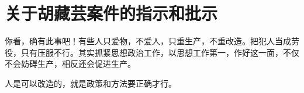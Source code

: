 \section[关于胡藏芸案件的指示和批示（一九六四年四月）]{关于胡藏芸案件的指示和批示}


你看，确有此事吧！有些人只爱物，不爱人，只重生产，不重改造。把犯人当成劳役，只有压服不行。其实抓紧思想政治工作，以思想工作第一，作好这一面，不仅不会妨碍生产，相反还会促进生产。


人是可以改造的，就是政策和方法要正确才行。



